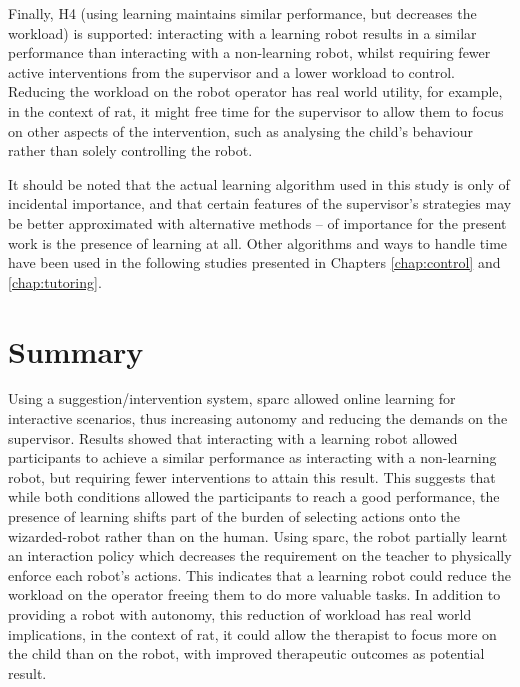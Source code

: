 Finally, H4 (using learning maintains similar performance, but decreases the workload) is supported: interacting with a learning robot results in a similar performance than interacting with a non-learning robot, whilst requiring fewer active interventions from the supervisor and a lower workload to control. Reducing the workload on the robot operator has real world utility, for example, in the context of \gls{rat}, it might free time for the supervisor to allow them to focus on other aspects of the intervention, such as analysing the child's behaviour rather than solely controlling the robot. 

It should be noted that the actual learning algorithm used in this study is only of incidental importance, and that certain features of the supervisor's strategies may be better approximated with alternative methods -- of importance for the present work is the presence of learning at all. Other algorithms and ways to handle time have been used in the following studies presented in Chapters \ref{chap:control} and \ref{chap:tutoring}.

\section{Summary}


Using a suggestion/intervention system, \gls{sparc} allowed online learning for interactive scenarios, thus increasing autonomy and reducing the demands on the supervisor. Results showed that interacting with a learning robot allowed participants to achieve a similar performance as interacting with a non-learning robot, but requiring fewer interventions to attain this result. This suggests that while both conditions allowed the participants to reach a good performance, the presence of learning shifts part of the burden of selecting actions onto the wizarded-robot rather than on the human. Using \gls{sparc}, the robot partially learnt an interaction policy which decreases the requirement on the teacher to physically enforce each robot's actions. This indicates that a learning robot could reduce the workload on the operator freeing them to do more valuable tasks. In addition to providing a robot with autonomy, this reduction of workload has real world implications, in the context of \gls{rat}, it could allow the therapist to focus more on the child than on the robot, with improved therapeutic outcomes as potential result. 

